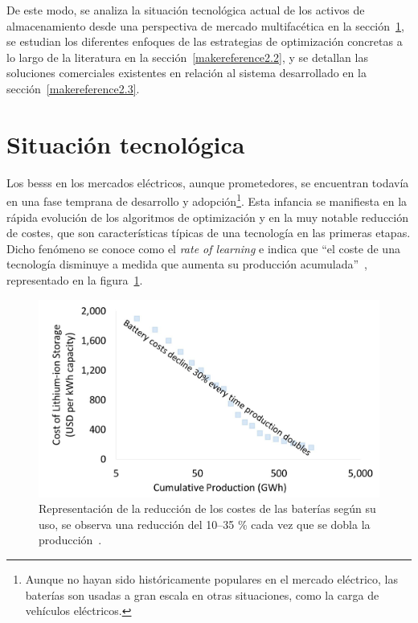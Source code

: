 De este modo, se analiza la situación tecnológica actual de los activos de almacenamiento desde una perspectiva de mercado multifacética en la sección~\ref{makereference2.1}, se estudian los diferentes enfoques de las estrategias de optimización concretas a lo largo de la literatura en la sección~\ref{makereference2.2}, y se detallan las soluciones comerciales existentes en relación al sistema desarrollado en la sección~\ref{makereference2.3}.

\section{Situación tecnológica}%
\label{makereference2.1}

Los \glspl{bess} en los mercados eléctricos, aunque prometedores, se encuentran todavía en una fase temprana de desarrollo y adopción\footnote{Aunque no hayan sido históricamente populares en el mercado eléctrico, las baterías son usadas a gran escala en otras situaciones, como la carga de vehículos eléctricos.}. Esta infancia se manifiesta en la rápida evolución de los algoritmos de optimización y en la muy notable reducción de costes, que son características típicas de una tecnología en las primeras etapas. Dicho fenómeno se conoce como el \textit{rate of learning} e indica que ``el coste de una tecnología disminuye a medida que aumenta su producción acumulada''~\cite{mathew2021climate, louwen2018technological}, representado en la figura~\ref{fig:rate-of-learning}.

\begin{figure}
  \centering
  \includegraphics[width=0.75\linewidth]{figures/rate-of-learning.jpg}
  \caption[Reducción de los costes de las baterías por su uso.]{Representación de la reducción de los costes de las baterías según su uso, se observa una reducción del 10--35 \% cada vez que se dobla la producción~\cite{irena2025irena}.}%
  \label{fig:rate-of-learning}
\end{figure}

